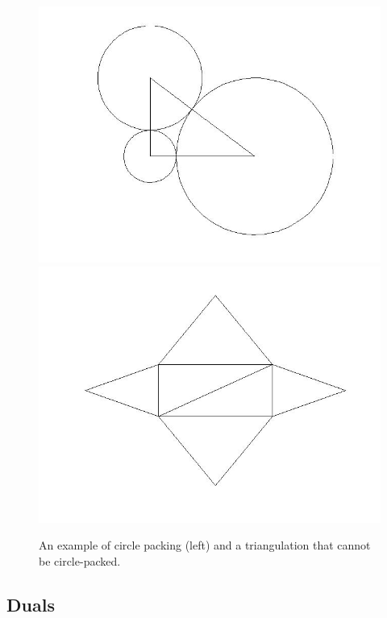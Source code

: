 \documentclass[12pt]{article}
\begin{document}
  
\begin{figure}
\includegraphics[scale = 0.3]{righttriangulation.jpg}
\includegraphics[scale = 0.3]{badcase.jpg}
\caption{An example of circle packing (left) and a triangulation that cannot be circle-packed.}
\label{rightTri}
\end{figure}

\subsection{Duals}
\maketitle
\end{document}
